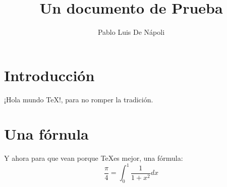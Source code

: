 \documentclass[12pt,letterpaper]{article}
\begin{document}
 
\title{Un documento de Prueba} 
\author{Pablo Luis De Nápoli} 
\maketitle 
\section{Introducción} 
¡Hola mundo \TeX !, para no romper la tradición. 
\section{Una fórnula} 
Y ahora para que vean porque \TeX es mejor, una fórmula: 
$$ \frac{\pi}{4} = \int_0^1 \frac{1}{1+x^2} dx $$ 
\end{document}
